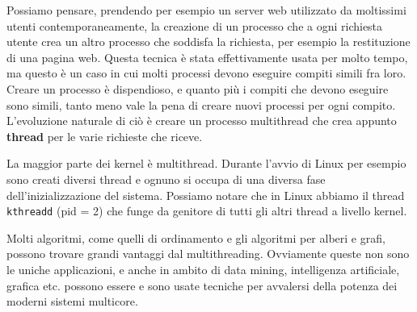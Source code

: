         Possiamo pensare, prendendo per esempio un server web utilizzato da moltissimi utenti contemporaneamente, la creazione di un processo che a ogni richiesta utente crea un altro processo che soddisfa la richiesta, per esempio la restituzione di una pagina web. Questa tecnica è stata effettivamente usata per molto tempo, ma questo è un caso in cui molti processi devono eseguire compiti simili fra loro. Creare un processo è dispendioso, e quanto più i compiti che devono eseguire sono simili, tanto meno vale la pena di creare nuovi processi per ogni compito. L'evoluzione naturale di ciò è creare un processo multithread che crea appunto \textbf{thread} per le varie richieste che riceve.
        
        La maggior parte dei kernel è multithread. Durante l'avvio di Linux per esempio sono creati diversi thread e ognuno si occupa di una diversa fase dell'inizializzazione del sistema. Possiamo notare che in Linux abbiamo il thread \texttt{kthreadd} (pid = 2) che funge da genitore di tutti gli altri thread a livello kernel.
        
        Molti algoritmi, come quelli di ordinamento e gli algoritmi per alberi e grafi, possono trovare grandi vantaggi dal multithreading. Ovviamente queste non sono le uniche applicazioni, e anche in ambito di data mining, intelligenza artificiale, grafica etc. possono essere e sono usate tecniche per avvalersi della potenza dei moderni sistemi multicore.
        

